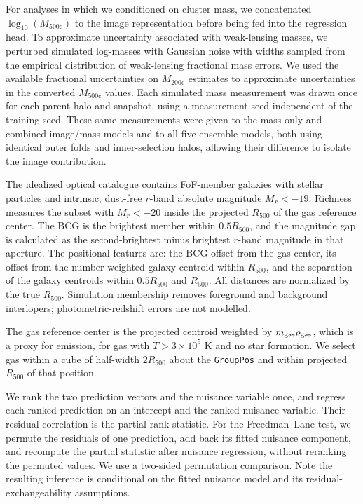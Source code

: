 For analyses in which we conditioned on cluster mass, we concatenated $\log_{10} (M_\text{500c})$ to the image representation before being fed into the regression head.
To approximate uncertainty associated with weak-lensing masses, we perturbed simulated log-masses with Gaussian noise with widths sampled from the empirical distribution of weak-lensing fractional mass errors.
We used the available fractional uncertainties on $M_\text{200c}$ estimates to approximate uncertainties in the converted $M_\text{500c}$ values.
Each simulated mass measurement was drawn once for each parent halo and snapshot, using a measurement seed independent of the training seed.
These same measurements were given to the mass-only and combined image/mass models and to all five ensemble models, both using identical outer folds and inner-selection halos, allowing their difference to isolate the image contribution.

The idealized optical catalogue contains FoF-member galaxies with stellar particles and intrinsic, dust-free $r$-band absolute magnitude $M_r < -19$.
Richness measures the subset with $M_r < -20$ inside the projected $R_{500}$ of the gas reference center.
The BCG is the brightest member within $0.5 R_{500}$, and the magnitude gap is calculated as the second-brightest minus brightest $r$-band magnitude in that aperture.
The positional features are: the BCG offset from the gas center, its offset from the number-weighted galaxy centroid within $R_{500}$, and the separation of the galaxy centroids within $0.5R_{500}$ and $R_{500}$.
All distances are normalized by the true $R_{500}$.
Simulation membership removes foreground and background interlopers; photometric-redshift errors are not modelled.

The gas reference center is the projected centroid weighted by $m_{\rm gas}\rho_{\rm gas}$, which is a proxy for emission, for gas with $T>3\times10^5$ K and no star formation.
We select gas within a cube of half-width $2R_{500}$ about the \texttt{GroupPos} and within projected $R_{500}$ of that position.

We rank the two prediction vectors and the nuisance variable once, and regress each ranked prediction on an intercept and the ranked nuisance variable.
Their residual correlation is the partial-rank statistic.
For the Freedman--Lane test, we permute the residuals of one prediction, add back its fitted nuisance component, and recompute the partial statistic after nuisance regression, without reranking the permuted values.
We use a two-sided permutation comparison.
Note the resulting inference is conditional on the fitted nuisance model
and its residual-exchangeability assumptions.
